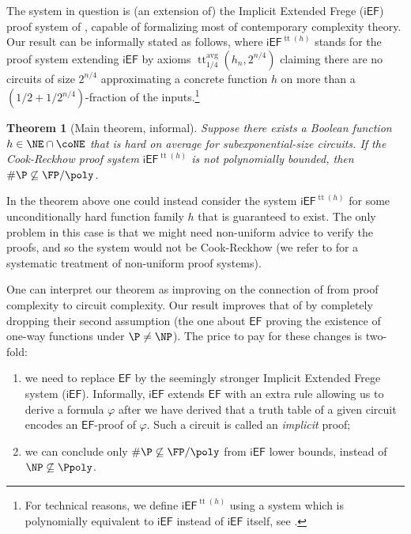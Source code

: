 \documentclass[11pt]{article}
\newcommand{\EF}{\mathsf{EF}}
\newcommand{\iEF}{\mathsf{iEF}}
\theoremstyle{definition}
\theoremstyle{plain}
\newtheorem{theorem}[definition]{Theorem}
\theoremstyle{remark}
\DeclareMathOperator*{\ttt}{tt}
\newcommand{\ttable}{\ttt^{\operatorname{avg}}}
\begin{document}
The system in question is (an extension of) the Implicit Extended Frege ($\iEF$) proof system of \citeauthor{Kra04} \cite{Kra04}, capable of formalizing most of contemporary complexity theory. Our result can be informally stated as follows, where 
$\iEF^{\operatorname{tt}(h)}$ stands for the proof system extending $\iEF$ by axioms $\ttable_{1/4}(h_n,2^{n/4})$ claiming there are no circuits of size $2^{n/4}$ approximating a concrete function $h$ on more than a $(1/2 + 1/{2^{n/4}})$-fraction of the inputs.\footnote{For technical reasons, we define $\iEF^{\operatorname{tt}(h)}$ using a system which is polynomially equivalent to $\iEF$ instead of $\iEF$ itself, see .}

\begin{theorem}
[Main theorem, informal]  \label{thm:main}
  Suppose there exists a Boolean function $h \in \NE \cap \coNE$ that is hard on average for subexponential-size circuits. If the Cook-Reckhow proof system $\iEF^{\operatorname{tt}(h)}$ is not polynomially bounded, then $\#\P \not\subseteq \FP/\poly$.
\end{theorem}

In the theorem above one could instead consider the system $\iEF^{\operatorname{tt}(h)}$ for some unconditionally hard function family $h$ that is guaranteed to exist. The only problem in this case is that we might need non-uniform advice to verify the proofs, and so the system would not be Cook-Reckhow (we refer to \citeauthor{CK07} \cite{CK07} for a systematic treatment of non-uniform proof systems).

One can interpret our theorem as improving on the connection of \citeauthor{Pseopt} \cite{Pseopt} from proof complexity to circuit complexity. Our result improves that of \citeauthor{Pseopt} by completely dropping their second assumption (the one about $\EF$ proving the existence of one-way functions under $\P \neq \NP$). The price to pay for these changes is two-fold: 
\begin{enumerate}
\item we need to replace $\EF$ by the seemingly stronger Implicit Extended Frege system ($\iEF$). Informally, $\iEF$ extends $\EF$ with an extra rule allowing us to derive a formula $\varphi$ after we have derived that a truth table of a given circuit encodes an $\EF$-proof of $\varphi$. Such a circuit is called an \emph{implicit} proof;

\item we can conclude only $\#\P\not\subseteq \FP/\poly$ from $\iEF$ lower bounds, instead of $\NP \not\subseteq \Ppoly$.
\end{enumerate}
\end{document}
